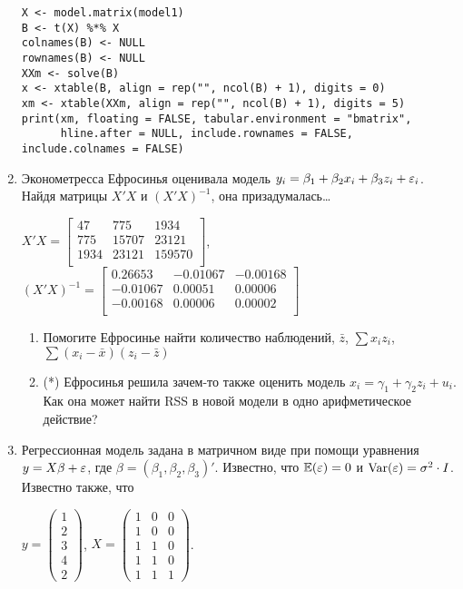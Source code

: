 \documentclass[12pt, a4paper]{article}
\theoremstyle{definition}
\begin{document}
\begin{enumerate}
\begin{verbatim}
X <- model.matrix(model1)
B <- t(X) %*% X
colnames(B) <- NULL
rownames(B) <- NULL
XXm <- solve(B)
x <- xtable(B, align = rep("", ncol(B) + 1), digits = 0)
xm <- xtable(XXm, align = rep("", ncol(B) + 1), digits = 5)
print(xm, floating = FALSE, tabular.environment = "bmatrix",
      hline.after = NULL, include.rownames = FALSE, include.colnames = FALSE)
\end{verbatim}



\item Эконометресса Ефросинья оценивала модель $y_i=\beta_1 + \beta_2 x_i + \beta_3 z_i + \varepsilon_i$. Найдя матрицы $X'X$ и $(X'X)^{-1}$, она призадумалась\ldots

$X'X = \begin{bmatrix}{}
  47 & 775 & 1934 \\
  775 & 15707 & 23121 \\
  1934 & 23121 & 159570 \\
  \end{bmatrix}$,
$(X'X)^{-1}=\begin{bmatrix}{}
  0.26653 & -0.01067 & -0.00168 \\
  -0.01067 & 0.00051 & 0.00006 \\
  -0.00168 & 0.00006 & 0.00002 \\
  \end{bmatrix}$


\begin{enumerate}
\item Помогите Ефросинье найти количество наблюдений, $\bar{z}$, $\sum x_i z_i$, $\sum(x_i-\bar{x})(z_i-\bar{z})$
\item (*) Ефросинья решила зачем-то также оценить модель $x_i = \gamma_1 + \gamma_2 z_i + u_i$. Как она может найти RSS в новой модели в одно арифметическое действие?
\end{enumerate}

\item Регрессионная модель  задана в матричном виде при помощи уравнения $y=X\beta+\varepsilon$, где $\beta=(\beta_1,\beta_2,\beta_3)'$.
Известно, что $\mathbb{E}(\varepsilon)=0$  и  $\operatorname{Var}(\varepsilon)=\sigma^2\cdot I$.
Известно также, что

$y=\left(
\begin{array}{c}
1\\
2\\
3\\
4\\
2
\end{array}\right)$,
$X=\left(\begin{array}{ccc}
1 & 0 & 0 \\
1 & 0 & 0 \\
1 & 1 & 0 \\
1 & 1 & 0 \\
1 & 1 & 1
\end{array}\right)$.



\end{enumerate}
\end{document}
